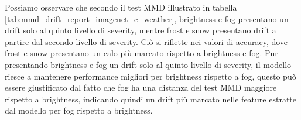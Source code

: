 Possiamo osservare che secondo il test MMD illustrato in tabella \ref{tab:mmd_drift_report_imagenet_c_weather}, brightness e fog presentano un drift solo al quinto livello di severity, mentre frost e snow presentano drift a partire dal secondo livello di severity. Ciò si riflette nei valori di accuracy, dove frost e snow presentano un calo più marcato rispetto a brightness e fog. Pur presentando brightness e fog un drift solo al quinto livello di severity, il modello riesce a mantenere performance migliori per brightness rispetto a fog, questo può essere giustificato dal fatto che fog ha una distanza del test MMD maggiore rispetto a brightness, indicando quindi un drift più marcato nelle feature estratte dal modello per fog rispetto a brightness.